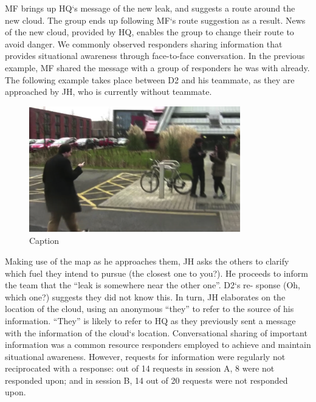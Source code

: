 MF brings up HQ`s message of the new leak, and suggests a route around the new cloud. The group ends up following MF`s route suggestion as a result. News of the new cloud, provided by HQ, enables the group to change their route to avoid danger. We commonly observed responders sharing information that provides situational awareness through face-to-face conversation. In the previous example, MF shared the message with a group of responders he was with already. The following example takes place between D2 and his teammate, as they are approached by JH, who is currently without teammate.\\

\begin{figure}[h]
  \centering
  \includegraphics[width=.6\textwidth]{img/study1/ep4/ep41}
  \caption{Caption}
  \label{fig:study1ep41}
\end{figure}

\noindent{} 


Making use of the map as he approaches them, JH asks the others to clarify which fuel they intend to pursue (the closest one to you?). He proceeds to inform the team that the ``leak is somewhere near the other one''. D2`s re- sponse (Oh, which one?) suggests they did not know this. In turn, JH elaborates on the location of the cloud, using an anonymous ``they'' to refer to the source of his information. ``They'' is likely to refer to HQ as they previously sent a message with the information of the cloud`s location. Conversational sharing of important information was a common resource responders employed to achieve and maintain situational awareness. However, requests for information were regularly not reciprocated with a response: out of 14 requests in session A, 8 were not responded upon; and in session B, 14 out of 20 requests were not responded upon.\\

